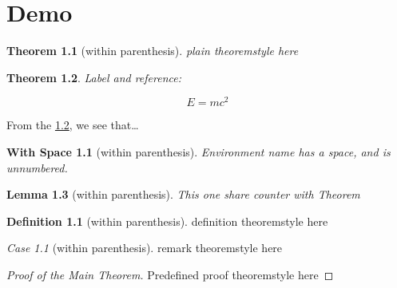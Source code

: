 \theoremstyle{plain}
\newtheorem{Theorem}{Theorem}[chapter]
\newtheorem{Lemma}[Theorem]{Lemma}
\newtheorem{Corollary}[Theorem]{Corollary}
\newtheorem{Proposition}{Proposition}[chapter]
\newtheorem{Conjecture}[Proposition]{Conjecture}
\newtheorem*{With Space}{With Space}
\newtheorem{WithoutSpace}{WithoutSpace}[chapter]
\theoremstyle{definition}
\newtheorem{Definition}{Definition}[chapter]
\theoremstyle{remark}
\newtheorem{Case}{Case}[chapter]

\chapter{Demo}\label{demo}

\begin{Theorem}[within parenthesis]
plain theoremstyle here
\end{Theorem}

\begin{Theorem}\label{simplestEquation}
\hypertarget{simplestEquation}{}
Label and reference:

\[E=mc^2\]
\end{Theorem}

From the \ref{simplestEquation}, we see that\ldots{}

\begin{With Space}[within parenthesis]
Environment name has a space, and is unnumbered.
\end{With Space}

\begin{Lemma}[within parenthesis]
This one share counter with Theorem
\end{Lemma}

\begin{Definition}[within parenthesis]
definition theoremstyle here
\end{Definition}

\begin{Case}[within parenthesis]
remark theoremstyle here
\end{Case}

\begin{proof}[Proof of the Main Theorem]
Predefined proof theoremstyle here
\end{proof}
